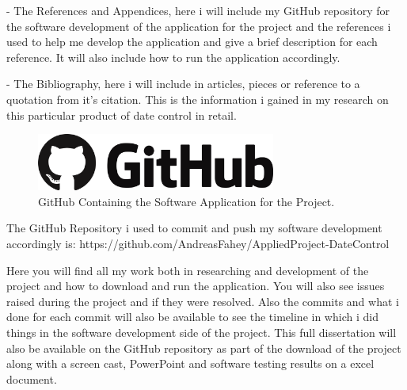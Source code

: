 - The References and Appendices, here i will include my GitHub repository for the software development of the application for the project and the references i used to help me develop the application and give a brief description for each reference. It will also include how to run the application accordingly.
\newline

- The Bibliography, here i will include in articles, pieces or reference to a quotation from it's citation. This is the information i gained in my research on this particular product of date control in retail. 
\newpage

\begin{figure}[h!]
	\caption{GitHub Containing the Software Application for the Project.}
	\label{image:github}
	\centering
	\includegraphics[width=0.7\textwidth]{images/github.png}
\end{figure}

The GitHub Repository i used to commit and push my software development accordingly is: https://github.com/AndreasFahey/AppliedProject-DateControl
\newline

Here you will find all my work both in researching and development of the project and how to download and run the application. You will also see issues raised during the project and if they were resolved. Also the commits and what i done for each commit will also be available to see the timeline in which i did things in the software development side of the project. This full dissertation will also be available on the GitHub repository as part of the download of the project along with a screen cast, PowerPoint and software testing results on a excel document.



